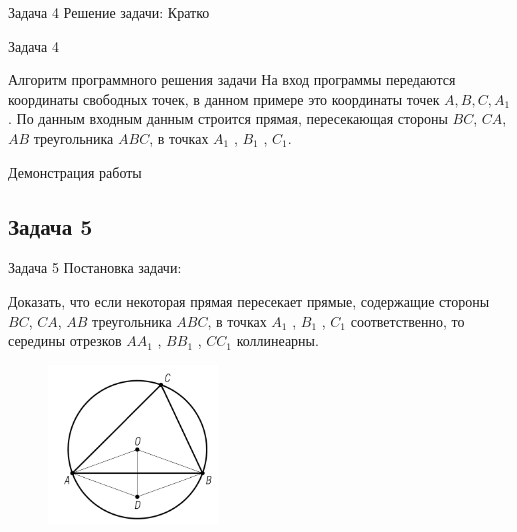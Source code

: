 \documentclass{beamer}
\begin{document}
\begin{frame}
   \begin{block}{Задача 4}
      Решение задачи:
      Кратко
   \end{block}
\end{frame}

\begin{frame}
   \begin{block}{Задача 4}
      \begin{block}{Алгоритм программного решения задачи}
         На вход программы передаются координаты свободных точек, в данном примере это координаты точек \(A,B,C,A_1\). По данным входным данным строится прямая, пересекающая стороны \(BC\), \(CA\), \(AB\) треугольника \(ABC\), в точках \(A_1\) , \(B_1\) , \(C_1\).
      \end{block}
   \end{block}
\end{frame}

\begin{frame}
   Демонстрация работы
\end{frame}

\begin{frame}
   \subsection{Задача 5}
   \begin{block}{Задача 5}
      Постановка задачи:

      Доказать, что если некоторая прямая пересекает прямые, содержащие стороны \(BC\), \(CA\), \(AB\) треугольника \(ABC\), в точках \(A_1\) , \(B_1\) , \(C_1\) соответственно, то середины отрезков \(AA_1\) , \(BB_1\) , \(CC_1\) коллинеарны.

      \begin{figure}[h]
         \centering
         \includegraphics[width=0.4\textwidth]{images/task1.png}
         \label{task5}
      \end{figure}
   \end{block}
\end{frame}
\end{document}
